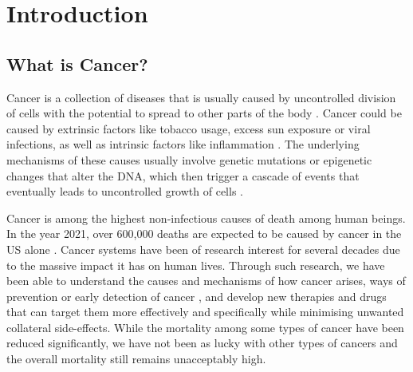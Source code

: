 \chapter{Introduction}

\section{What is Cancer?}
Cancer is a collection of diseases that is usually caused by uncontrolled division of cells with the potential to spread to other parts of the body \cite{cancergov}. Cancer could be caused by extrinsic factors like tobacco usage, excess sun exposure or viral infections, as well as intrinsic factors like inflammation \cite{Trichopoulos,Coussens}. The underlying mechanisms of these causes usually involve genetic mutations or epigenetic changes that alter the DNA, which then trigger a cascade of events that eventually leads to uncontrolled growth of cells \cite{Moolgavkar,Gronbaek}.

Cancer is among the highest non-infectious causes of death among human beings. In the year 2021, over 600,000 deaths are expected to be caused by cancer in the US alone \cite{cancer_stats}. Cancer systems have been of research interest for several decades due to the massive impact it has on human lives. Through such research, we have been able to understand the causes and mechanisms of how cancer arises, ways of prevention or early detection of cancer \cite{Loeb,Elmore,Goodman}, and develop new therapies and drugs that can target them more effectively and specifically while minimising unwanted collateral side-effects. While the mortality among some types of cancer have been reduced significantly, we have not been as lucky with other types of cancers and the overall mortality still remains unacceptably high.

